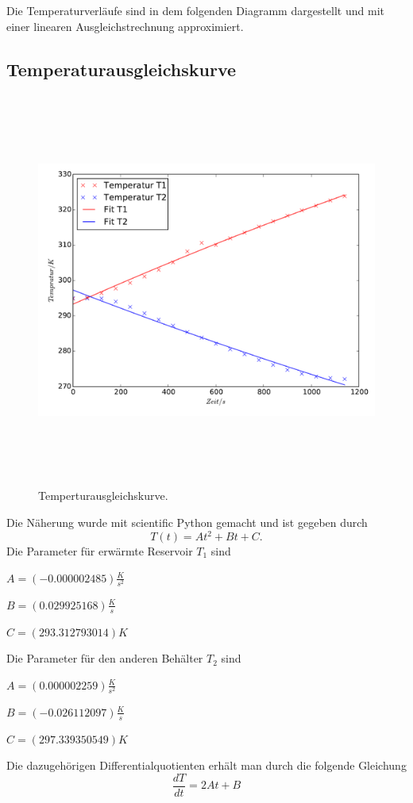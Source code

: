 Die Temperaturverläufe sind in dem folgenden Diagramm dargestellt und mit einer
linearen Ausgleichstrechnung approximiert.
\subsection{Temperaturausgleichskurve}
\begin{figure}
\includegraphics[height=13cm]{Temperaturgraphik.pdf}
\caption{Temperturausgleichskurve.}
\end{figure}

Die Näherung wurde mit scientific Python gemacht und ist gegeben durch
\begin{equation}
  T(t)=At^2+Bt+C .
\end{equation}
Die Parameter für erwärmte Reservoir $T_1$ sind

  $A=(-0.000002485)\frac{K}{s^2}$

  $B=(0.029925168)\frac{K}{s}$

  $C=(293.312793014)K$

Die Parameter für den anderen Behälter $T_2$ sind

  $A=(0.000002259)\frac{K}{s^2}$

  $B=(-0.026112097)\frac{K}{s}$

  $C=(297.339350549)K$

Die dazugehörigen Differentialquotienten erhält man durch die folgende Gleichung
\begin{equation}
\frac{dT}{dt}=2At+B
\end{equation}

